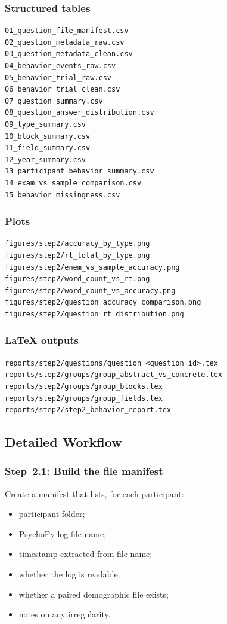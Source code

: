 \subsubsection*{Structured tables}
\begin{verbatim}
01_question_file_manifest.csv
02_question_metadata_raw.csv
03_question_metadata_clean.csv
04_behavior_events_raw.csv
05_behavior_trial_raw.csv
06_behavior_trial_clean.csv
07_question_summary.csv
08_question_answer_distribution.csv
09_type_summary.csv
10_block_summary.csv
11_field_summary.csv
12_year_summary.csv
13_participant_behavior_summary.csv
14_exam_vs_sample_comparison.csv
15_behavior_missingness.csv
\end{verbatim}

\subsubsection*{Plots}
\begin{verbatim}
figures/step2/accuracy_by_type.png
figures/step2/rt_total_by_type.png
figures/step2/enem_vs_sample_accuracy.png
figures/step2/word_count_vs_rt.png
figures/step2/word_count_vs_accuracy.png
figures/step2/question_accuracy_comparison.png
figures/step2/question_rt_distribution.png
\end{verbatim}

\subsubsection*{\LaTeX{} outputs}
\begin{verbatim}
reports/step2/questions/question_<question_id>.tex
reports/step2/groups/group_abstract_vs_concrete.tex
reports/step2/groups/group_blocks.tex
reports/step2/groups/group_fields.tex
reports/step2/step2_behavior_report.tex
\end{verbatim}

\subsection{Detailed Workflow}

\subsubsection{Step~2.1: Build the file manifest}
Create a manifest that lists, for each participant:
\begin{itemize}
    \item participant folder;
    \item PsychoPy log file name;
    \item timestamp extracted from file name;
    \item whether the log is readable;
    \item whether a paired demographic file exists;
    \item notes on any irregularity.
\end{itemize}

